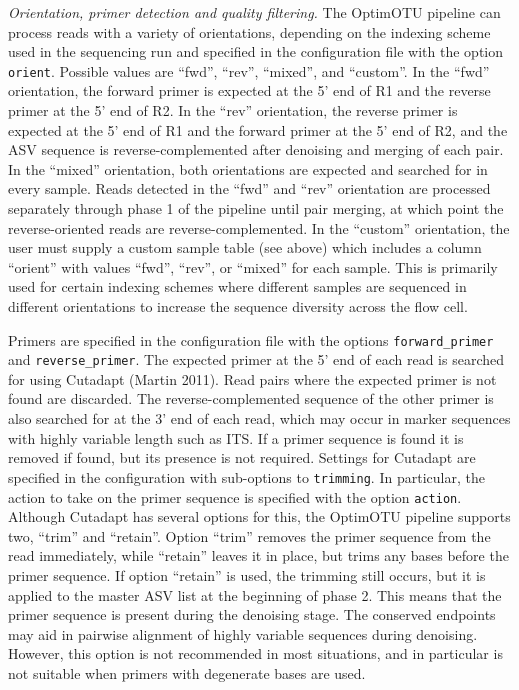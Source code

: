 \documentclass[
]{article}
\begin{document}
\emph{Orientation, primer detection and quality filtering.}
The OptimOTU pipeline can process reads with a variety of orientations, depending on the indexing scheme used in the sequencing run and specified in the configuration file with the option \texttt{orient}.
Possible values are ``fwd'', ``rev'', ``mixed'', and ``custom''.
In the ``fwd'' orientation, the forward primer is expected at the 5' end of R1 and the reverse primer at the 5' end of R2.
In the ``rev'' orientation, the reverse primer is expected at the 5' end of R1 and the forward primer at the 5' end of R2, and the ASV sequence is reverse-complemented after denoising and merging of each pair.
In the ``mixed'' orientation, both orientations are expected and searched for in every sample.
Reads detected in the ``fwd'' and ``rev'' orientation are processed separately through phase 1 of the pipeline until pair merging, at which point the reverse-oriented reads are reverse-complemented.
In the ``custom'' orientation, the user must supply a custom sample table (see above) which includes a column ``orient'' with values ``fwd'', ``rev'', or ``mixed'' for each sample.
This is primarily used for certain indexing schemes where different samples are sequenced in different orientations to increase the sequence diversity across the flow cell.

Primers are specified in the configuration file with the options \texttt{forward\_primer} and \texttt{reverse\_primer}.
The expected primer at the 5' end of each read is searched for using Cutadapt (Martin 2011).
Read pairs where the expected primer is not found are discarded.
The reverse-complemented sequence of the other primer is also searched for at the 3' end of each read, which may occur in marker sequences with highly variable length such as ITS.
If a primer sequence is found it is removed if found, but its presence is not required.
Settings for Cutadapt are specified in the configuration with sub-options to \texttt{trimming}.
In particular, the action to take on the primer sequence is specified with the option \texttt{action}.
Although Cutadapt has several options for this, the OptimOTU pipeline supports two, ``trim'' and ``retain''.
Option ``trim'' removes the primer sequence from the read immediately, while ``retain'' leaves it in place, but trims any bases before the primer sequence.
If option ``retain'' is used, the trimming still occurs, but it is applied to the master ASV list at the beginning of phase 2.
This means that the primer sequence is present during the denoising stage.
The conserved endpoints may aid in pairwise alignment of highly variable sequences during denoising.
However, this option is not recommended in most situations, and in particular is not suitable when primers with degenerate bases are used.
\end{document}
